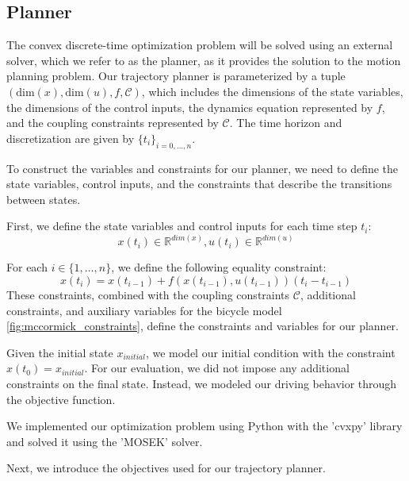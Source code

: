 \subsection{Planner}

The convex discrete-time optimization problem will be solved using an external solver, which we refer to as the planner, as it provides the solution
to the motion planning problem.
Our trajectory planner is parameterized by a tuple $(\text{dim}(x), \text{dim}(u), f, \mathcal{C})$, which includes the dimensions of the state
variables, the dimensions of the control inputs, the dynamics equation represented by $f$, and the coupling constraints represented by $\mathcal{C}$.
The time horizon and discretization are given by $\{t_i\}_{i=0,\dots,n}$.

To construct the variables and constraints for our planner, we need to define the state variables, control inputs, and the constraints that describe
the transitions between states.

First, we define the state variables and control inputs for each time step $t_i$:
\begin{equation}
	x(t_i) \in \mathbb{R}^{dim(x)}, u(t_i) \in \mathbb{R}^{dim(u)}
\end{equation}

For each $i\in\{1,\dots,n\}$, we define the following equality constraint:
\begin{equation}
	x(t_i) = x(t_{i-1}) + f(x(t_{i-1}), u(t_{i-1})) (t_i - t_{i-1})
\end{equation}
These constraints, combined with the coupling constraints $\mathcal{C}$, additional constraints, and auxiliary variables for the bicycle model
\ref{fig:mccormick_constraints}, define the constraints and variables for our planner.

Given the initial state $x_{initial}$, we model our initial condition with the constraint $x(t_0) = x_{initial}$.
For our evaluation, we did not impose any additional constraints on the final state.
Instead, we modeled our driving behavior through the objective function.

We implemented our optimization problem using Python with the 'cvxpy' library and solved it using the 'MOSEK' solver.

Next, we introduce the objectives used for our trajectory planner.

